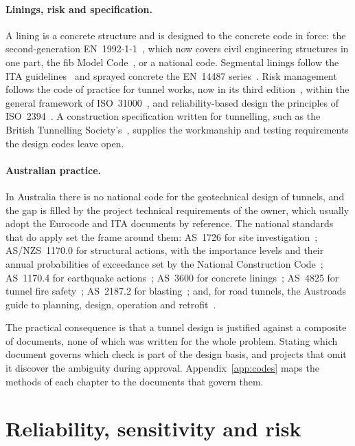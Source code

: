 \paragraph{Linings, risk and specification.}
A lining is a concrete structure and is designed to the concrete code in force:
the second-generation EN~1992-1-1~\citep{en1992part1}, which now covers civil
engineering structures in one part, the fib Model Code~\citep{fib2024mc2020},
or a national code. Segmental linings follow the ITA
guidelines~\citep{ita2019segmental} and sprayed concrete the
EN~14487 series~\citep{en14487part1,en14487part2}. Risk management follows the
code of practice for tunnel works, now in its third
edition~\citep{itaimia2023risk}, within the general framework of
ISO~31000~\citep{iso31000}, and reliability-based design the principles of
ISO~2394~\citep{iso2394}. A construction specification written for tunnelling,
such as the British Tunnelling Society's~\citep{bts2023spec}, supplies the
workmanship and testing requirements the design codes leave open.

\paragraph{Australian practice.}
In Australia there is no national code for the geotechnical design of tunnels,
and the gap is filled by the project technical requirements of the owner, which
usually adopt the Eurocode and ITA documents by reference. The national
standards that do apply set the frame around them: AS~1726 for site
investigation~\citep{as1726}; AS/NZS~1170.0 for structural actions, with the
importance levels and their annual probabilities of exceedance set by the
National Construction Code~\citep{asnzs1170part0}; AS~1170.4 for earthquake
actions~\citep{as1170part4}; AS~3600 for concrete linings~\citep{as3600};
AS~4825 for tunnel fire safety~\citep{as4825}; AS~2187.2 for
blasting~\citep{as2187part2}; and, for road tunnels, the Austroads guide to
planning, design, operation and retrofit~\citep{austroads2024agrt}.

The practical consequence is that a tunnel design is justified against a
composite of documents, none of which was written for the whole problem.
Stating which document governs which check is part of the design basis, and
projects that omit it discover the ambiguity during approval.
Appendix~\ref{app:codes} maps the methods of each chapter to the documents
that govern them.

\section{Reliability, sensitivity and risk}
\label{sec:reliability-and-code-frameworks}

